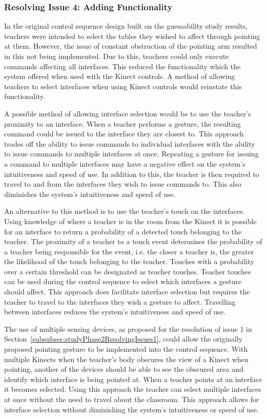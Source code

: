\documentclass[link]{IWCOMP}
\begin{document}
\subsubsection{Resolving Issue 4: Adding Functionality}
\label{subsubsec:studyPhase2ResolvingIssues4}

In the original control sequence design built on the guessability study results, teachers were intended to select the tables they wished to affect through pointing at them.
However, the issue of constant obstruction of the pointing arm resulted in this not being implemented.
Due to this, teachers could only execute commands affecting all interfaces.
This reduced the functionality which the system offered when used with the Kinect controls.
A method of allowing teachers to select interfaces when using Kinect controls would reinstate this functionality.

A possible method of allowing interface selection would be to use the teacher's proximity to an interface.
When a teacher performs a gesture, the resulting command could be issued to the interface they are closest to.
This approach trades off the ability to issue commands to individual interfaces with the ability to issue commands to multiple interfaces at once.
Repeating a gesture for issuing a command to multiple interfaces may have a negative effect on the system's intuitiveness and speed of use.
In addition to this, the teacher is then required to travel to and from the interfaces they wish to issue commands to.
This also diminishes the system's intuitiveness and speed of use.

An alternative to this method is to use the teacher's touch on the interfaces.
Using knowledge of where a teacher is in the room from the Kinect it is possible for an interface to return a probability of a detected touch belonging to the teacher.
The proximity of a teacher to a touch event determines the probability of a teacher being responsible for the event, i.e. the closer a teacher is, the greater the likelihood of the touch belonging to the teacher.
Touches with a probability over a certain threshold can be designated as teacher touches.
Teacher touches can be used during the control sequence to select which interfaces a gesture should affect.
This approach does facilitate interface selection but requires the teacher to travel to the interfaces they wish a gesture to affect.
Travelling between interfaces reduces the system's intuitiveness and speed of use.

The use of multiple sensing devices, as proposed for the resolution of issue 1 in Section~\ref{subsubsec:studyPhase2ResolvingIssues1}, could allow the originally proposed pointing gesture to be implemented into the control sequence.
With multiple Kinects when the teacher's body obscures the view of a Kinect when pointing, another of the devices should be able to see the obscured area and identify which interface is being pointed at.
When a teacher points at an interface it becomes selected.
Using this approach the teacher can select multiple interfaces at once without the need to travel about the classroom.
This approach allows for interface selection without diminishing the system's intuitiveness or speed of use.
\end{document}
